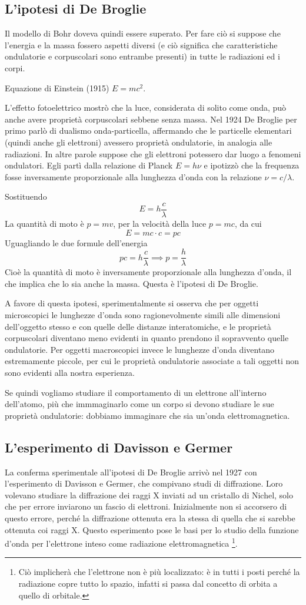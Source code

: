 \subsection{L'ipotesi di De Broglie}
Il modello di Bohr doveva quindi essere superato. Per fare ciò si suppose che l'energia e la massa fossero aspetti diversi (e ciò significa che caratteristiche ondulatorie e corpuscolari sono entrambe presenti) in tutte le radiazioni ed i corpi.

Equazione di Einstein (1915) $E=mc^2$.

L'effetto fotoelettrico mostrò che la luce, considerata di solito come onda, può anche avere proprietà corpuscolari sebbene senza massa. Nel 1924 De Broglie per primo parlò di dualismo onda-particella, affermando che le particelle elementari (quindi anche gli elettroni) avessero proprietà ondulatorie, in analogia alle radiazioni. In altre parole suppose che gli elettroni potessero dar luogo a fenomeni ondulatori. Egli partì dalla relazione di Planck $E=h\nu$ e ipotizzò che la frequenza fosse inversamente proporzionale alla lunghezza d'onda con la relazione $\nu=c/\lambda$. 

Sostituendo
$$E=h\frac{c}{\lambda}$$
La quantità di moto è $p=mv$, per la velocità della luce $p=mc$, da cui
$$E=mc \cdot c=pc$$
Uguagliando le due formule dell'energia
$$pc=h\frac{c}{\lambda} \implies p=\frac{h}{\lambda}$$
Cioè la quantità di moto è inversamente proporzionale alla lunghezza d'onda, il che implica che lo sia anche la massa. Questa è l'ipotesi di De Broglie.

A favore di questa ipotesi, sperimentalmente si osserva che per oggetti microscopici le lunghezze d'onda sono ragionevolmente simili alle dimensioni dell'oggetto stesso e con quelle delle distanze interatomiche, e le proprietà corpuscolari diventano meno evidenti in quanto prendono il sopravvento quelle ondulatorie. Per oggetti macroscopici invece le lunghezze d'onda diventano estremamente piccole, per cui le proprietà ondulatorie associate a tali oggetti non sono evidenti alla nostra esperienza.

Se quindi vogliamo studiare il comportamento di un elettrone all'interno dell'atomo, più che immmaginarlo come un corpo si devono studiare le sue proprietà ondulatorie: dobbiamo immaginare che sia un'onda elettromagnetica.
\subsection{L'esperimento di Davisson e Germer}
La conferma sperimentale all'ipotesi di De Broglie arrivò nel 1927 con l'esperimento di Davisson e Germer, che compivano studi di diffrazione. Loro volevano studiare la diffrazione dei raggi X inviati ad un cristallo di Nichel, solo che per errore inviarono un fascio di elettroni. Inizialmente non si accorsero di questo errore, perché la diffrazione ottenuta era la stessa di quella che si sarebbe ottenuta coi raggi X.
Questo esperimento pose le basi per lo studio della funzione d'onda per l'elettrone inteso come radiazione elettromagnetica \footnote{Ciò implicherà che l'elettrone non è più localizzato: è in tutti i posti perché la radiazione copre tutto lo spazio, infatti si passa dal concetto di orbita a quello di orbitale.}.

